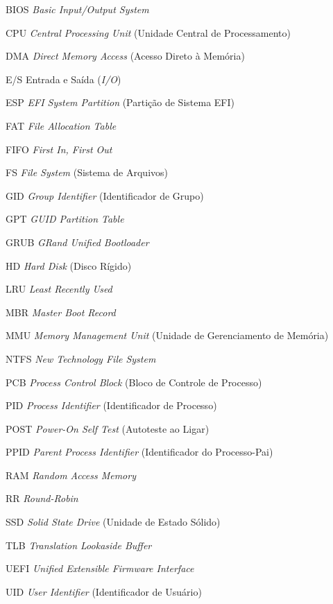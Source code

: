 \documentclass[12pt, a4paper, oneside, openany, chapter=TITLE, subsection=TITLE, section=TITLE, subsubsection=TITLE, subsubsubsection=TITLE, english, german, brazil]{abntex2}
\begin{document}
\listoffigures*
\clearpage

\listoftables*
\clearpage

\renewcommand{\lstlistlistingname}{Lista de códigos}
\lstlistoflistings
\clearpage

\begin{siglas}
    \item[BIOS] \textit{Basic Input/Output System}
    \item[CPU] \textit{Central Processing Unit} (Unidade Central de Processamento)
    \item[DMA] \textit{Direct Memory Access} (Acesso Direto à Memória)
    \item[E/S] Entrada e Saída (\textit{I/O})
    \item[ESP] \textit{EFI System Partition} (Partição de Sistema EFI)
    \item[FAT] \textit{File Allocation Table}
    \item[FIFO] \textit{First In, First Out}
    \item[FS] \textit{File System} (Sistema de Arquivos)
    \item[GID] \textit{Group Identifier} (Identificador de Grupo)
    \item[GPT] \textit{GUID Partition Table}
    \item[GRUB] \textit{GRand Unified Bootloader}
    \item[HD] \textit{Hard Disk} (Disco Rígido)
    \item[LRU] \textit{Least Recently Used}
    \item[MBR] \textit{Master Boot Record}
    \item[MMU] \textit{Memory Management Unit} (Unidade de Gerenciamento de Memória)
    \item[NTFS] \textit{New Technology File System}
    \item[PCB] \textit{Process Control Block} (Bloco de Controle de Processo)
    \item[PID] \textit{Process Identifier} (Identificador de Processo)
    \item[POST] \textit{Power-On Self Test} (Autoteste ao Ligar)
    \item[PPID] \textit{Parent Process Identifier} (Identificador do Processo-Pai)
    \item[RAM] \textit{Random Access Memory}
    \item[RR] \textit{Round-Robin}
    \item[SSD] \textit{Solid State Drive} (Unidade de Estado Sólido)
    \item[TLB] \textit{Translation Lookaside Buffer}
    \item[UEFI] \textit{Unified Extensible Firmware Interface}
    \item[UID] \textit{User Identifier} (Identificador de Usuário)
\end{siglas}
\end{document}
